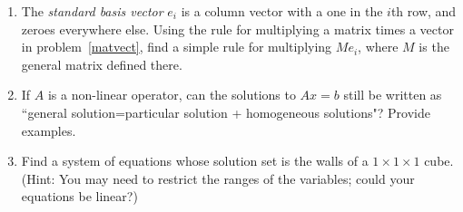 \begin{enumerate}
%

\item  The \emph{standard basis vector} $e_i$ is a column vector with a one in the $i$th row, and zeroes everywhere else.  Using the rule for multiplying a matrix times a vector in problem~\ref{matvect}, find a simple rule for multiplying $Me_i$, where $M$ is the general matrix defined there.

\item If $A$ is a non-linear operator, can the solutions to $Ax=b$ still be written as ``general solution=particular solution + homogeneous solutions"?  Provide examples.

\item Find a system of equations whose solution set is the walls of a $1\times1\times1$  cube. (Hint: You may need to restrict the ranges of the variables; could your equations be linear?)

\end{enumerate}




